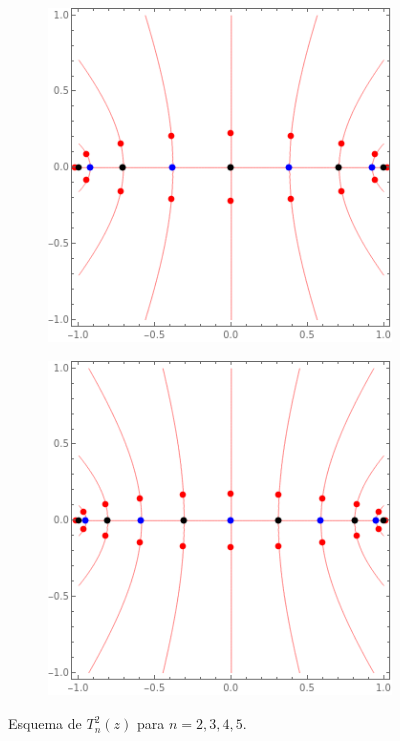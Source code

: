 \begin{solution}
\begin{itemize}
\begin{itemize}
\begin{figure}[h]
\begin{subfigure}{.4\textwidth}
                \includegraphics[scale=0.4]{dessins/t4.png}
            \end{subfigure}
            \begin{subfigure}{.4\textwidth}
                \centering
                \includegraphics[scale=0.4]{dessins/t5.png}
            \end{subfigure}
            \caption{Esquema de $T_n^2(z)$ para $n = 2,3,4,5$.}
        \end{figure}
    \end{itemize}
\end{itemize}
\end{solution}

